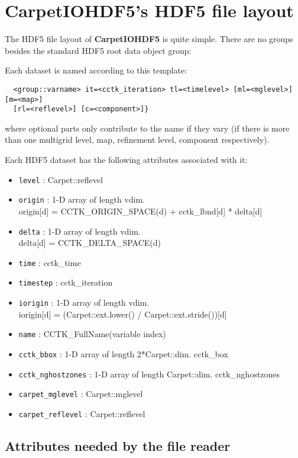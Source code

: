 \section{CarpetIOHDF5's HDF5 file layout}

The HDF5 file layout of {\bf CarpetIOHDF5} is quite simple.
There are no groups besides the standard HDF5 root data object group:

Each dataset is named according to this template:

\begin{verbatim}
  <group::varname> it=<cctk_iteration> tl=<timelevel> [ml=<mglevel>] [m=<map>]
  [rl=<reflevel>] [c=<component>]}
\end{verbatim}

where optional parts only contribute to the name if they vary (if there is
more than one multigrid level, map, refinement level, component respectively).

Each HDF5 dataset has the following attributes associated with it:

\begin{itemize}
  \item {\tt level} : Carpet::reflevel
  \item {\tt origin} : 1-D array of length vdim. \\
        origin[d] = CCTK\_ORIGIN\_SPACE(d) + cctk\_lbnd[d] * delta[d]
  \item {\tt delta} : 1-D array of length vdim. \\
        delta[d] = CCTK\_DELTA\_SPACE(d)
  \item {\tt time} : cctk\_time
  \item {\tt timestep} : cctk\_iteration
  \item {\tt iorigin} : 1-D array of length vdim. \\ iorigin[d] = (Carpet::ext.lower() / Carpet::ext.stride())[d]
  \item {\tt name} : CCTK\_FullName(variable index)
  \item {\tt cctk\_bbox} : 1-D array of length 2*Carpet::dim. cctk\_box
  \item {\tt cctk\_nghostzones} : 1-D array of length Carpet::dim. cctk\_nghostzones
  \item {\tt carpet\_mglevel} : Carpet::mglevel
  \item {\tt carpet\_reflevel} : Carpet::reflevel
\end{itemize}


\subsection{Attributes needed by the file reader}

